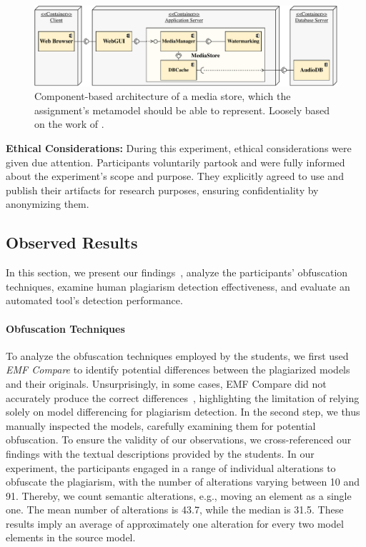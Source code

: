 \begin{figure}
    \centering
    \includegraphics[width=0.99\linewidth]{figures/mediastore.pdf}
    \caption[Example Instance for the Modeling Assignment]{Component-based architecture of a media store, which the assignment's metamodel should be able to represent. Loosely based on the work of \citet{becker2008a}.}
    \label{fig:mediastore}
\end{figure} 

\textbf{Ethical Considerations:}
During this experiment, ethical considerations were given due attention. Participants voluntarily partook and were fully informed about the experiment's scope and purpose. They explicitly agreed to use and publish their artifacts for research purposes, ensuring confidentiality by anonymizing them.%

\subsection{Observed Results}



\noindent
%
In this section, we present our findings~\cite{Saglam2023_supp}, analyze the participants' obfuscation techniques, examine human plagiarism detection effectiveness, and evaluate an automated tool's detection performance.

\paragraph{Obfuscation Techniques}
To analyze the obfuscation techniques employed by the students, we first used \textit{EMF Compare} to identify potential differences between the plagiarized models and their originals. Unsurprisingly, in some cases, EMF Compare did not accurately produce the correct differences~\cite{Wittler2023}, highlighting the limitation of relying solely on model differencing for plagiarism detection.
In the second step, we thus manually inspected the models, carefully examining them for potential obfuscation. To ensure the validity of our observations, we cross-referenced our findings with the textual descriptions provided by the students.
In our experiment, the participants engaged in a range of individual alterations to obfuscate the plagiarism, with the number of alterations varying between 10 and 91. Thereby, we count semantic alterations, e.g., moving an element as a single one. The mean number of alterations is 43.7, while the median is 31.5. These results imply an average of approximately one alteration for every two model elements in the source model.

